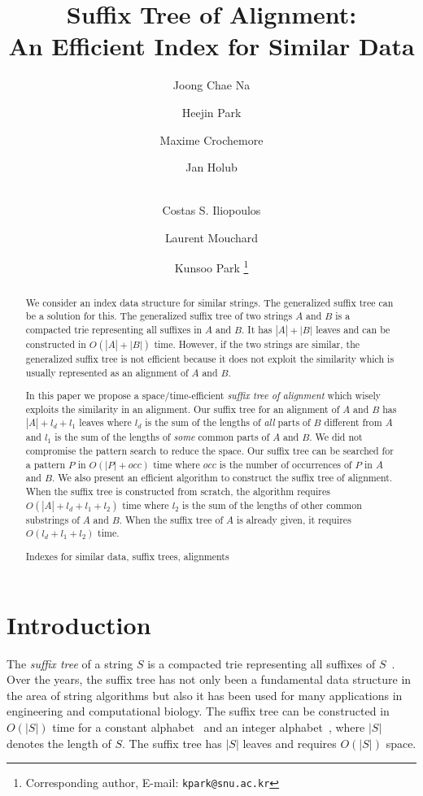 \documentclass{llncs}
\title{Suffix Tree of Alignment:\\An Efficient Index for Similar Data}
\author{
    Joong Chae Na\inst{1}
\and
     Heejin Park\inst{2}
\and
     Maxime Crochemore\inst{3}
\and
     Jan Holub\inst{4}
\and \\
     Costas S. Iliopoulos\inst{3}
\and
     Laurent Mouchard\inst{5}
\and
     Kunsoo Park\inst{6}
\thanks{Corresponding author, E-mail: {\tt kpark@snu.ac.kr}}
}
\institute{
Sejong University,
Korea
\and
Hanyang University,
Korea
\and
King's College London,
UK
\and
Czech Technical University in Prague,
Czech Republic
\and
University of Rouen,
France
\and
Seoul National University,
Korea
}
\newcommand{\partitle}[1]{}                        \newcommand{\commentout}[1]{}
\newcommand{\keywords}[1]{\par\addvspace\baselineskip
\noindent\keywordname\enspace\ignorespaces#1}
\begin{document}
\maketitle



\begin{abstract}
We consider an index data structure for similar strings.
The generalized suffix tree can be a solution for this.
The generalized suffix tree of two strings $A$ and $B$
 is a compacted trie representing all suffixes in $A$ and $B$.
It has $|A|+|B|$ leaves and can be constructed in $O(|A|+|B|)$ time.
However, if the two strings are similar,
 the generalized suffix tree is not efficient
 because it does not exploit the similarity
 which is usually represented as an alignment of $A$ and $B$.

In this paper we propose a space/time-efficient
{\em suffix tree of alignment}
which wisely exploits the similarity in an alignment.
Our suffix tree for an alignment of $A$ and $B$ has
$|A| + l_d + l_1$ leaves
where $l_d$ is the sum of the lengths of {\em all} parts of $B$ different from $A$
and $l_1$ is the sum of the lengths of {\em some} common parts of $A$ and $B$.
We did not compromise the pattern search
to reduce the space.
Our suffix tree can be searched for a pattern $P$
in $O(|P|+occ)$ time
where $occ$ is the number of occurrences of $P$ in $A$ and $B$.
We also present an efficient algorithm
to construct the suffix tree of alignment.
When the suffix tree is constructed from scratch,
the algorithm requires $O(|A| + l_d + l_1 + l_2)$ time
where $l_2$ is the sum of the lengths of other common
substrings of $A$ and $B$.
When the suffix tree of $A$ is already given,
it requires $O(l_d + l_1 + l_2)$ time.
\keywords{Indexes for similar data, suffix trees, alignments}
\end{abstract}



\pagestyle{headings}  
\setcounter{page}{1}



\section{Introduction}




\partitle{Suffix trees}

The {\em suffix tree} of a string $S$
 is a compacted trie representing all suffixes of $S$~\cite{McCreight:76,Weiner:73}.
Over the years, the suffix tree
 has not only been a fundamental data structure in the area of string algorithms
 but also it has been used for many applications in engineering and computational biology.
The suffix tree can be constructed in $O(|S|)$ time
 for a constant alphabet~\cite{McCreight:76,Ukkonen:95}
 and an integer alphabet~\cite{Farach-Colton&Ferragina:00},
 where $|S|$ denotes the length of $S$.
The suffix tree has $|S|$ leaves and requires $O(|S|)$ space.
\end{document}
